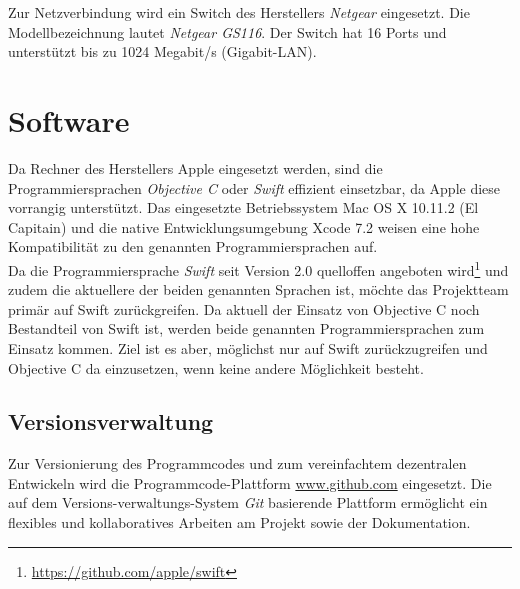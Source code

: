 Zur Netzverbindung wird ein Switch des Herstellers \emph{Netgear} eingesetzt. Die Modellbezeichnung lautet \emph{Netgear GS116}. Der Switch hat 16 Ports und unterstützt bis zu 1024 Megabit/s (Gigabit-LAN).

\section{Software}
\label{softwarebasis}
Da Rechner des Herstellers Apple eingesetzt werden, sind die Programmiersprachen \emph{Objective C} oder \emph{Swift} effizient einsetzbar, da Apple diese vorrangig unterstützt. Das eingesetzte Betriebssystem Mac OS X 10.11.2 (El Capitain) und die native Entwicklungsumgebung Xcode 7.2 weisen eine hohe Kompatibilität zu den genannten Programmiersprachen auf. \\
Da die Programmiersprache \emph{Swift} seit Version 2.0 quelloffen angeboten wird\footnote{\url{https://github.com/apple/swift}} und zudem die aktuellere der beiden genannten Sprachen ist, möchte das Projektteam primär auf Swift zurückgreifen. Da aktuell der Einsatz von Objective C noch Bestandteil von Swift ist, werden beide genannten Programmiersprachen zum Einsatz kommen. Ziel ist es aber, möglichst nur auf Swift zurückzugreifen und Objective C da einzusetzen, wenn keine andere Möglichkeit besteht. \\
\subsection{Versionsverwaltung}
Zur Versionierung des Programmcodes und zum vereinfachtem dezentralen Entwickeln wird die Programmcode-Plattform \url{www.github.com} eingesetzt. Die auf dem Versions-verwaltungs-System \emph{Git} basierende Plattform ermöglicht ein flexibles und kollaboratives Arbeiten am Projekt sowie der Dokumentation. \\
